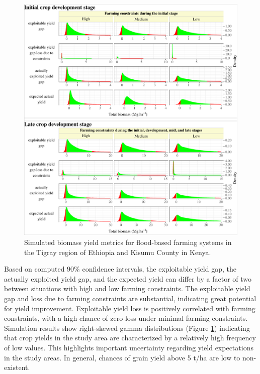 \documentclass[]{elsarticle} %
\begin{document}
\begin{figure}[!h]

{\centering \includegraphics[width=1\linewidth,]{figures/Modelling_FBFS_biomass_yield_Initial_and_late_stage} 

}

\caption{Simulated biomass yield metrics for flood-based farming systems in the Tigray region of Ethiopia and Kisumu County in Kenya.}\label{fig:fig8}
\end{figure}

Based on computed 90\% confidence intervals, the exploitable yield gap, the actually exploited yield gap, and the expected yield can differ by a factor of two between situations with high and low farming constraints. The exploitable yield gap and loss due to farming constraints are substantial, indicating great potential for yield improvement. Exploitable yield loss is positively correlated with farming constraints, with a high chance of zero loss under minimal farming constraints. Simulation results show right-skewed gamma distributions (Figure \ref{fig:fig8}) indicating that crop yields in the study area are characterized by a relatively high frequency of low values. This highlights important uncertainty regarding yield expectations in the study areas. In general, chances of grain yield above 5 t/ha are low to non-existent.
\end{document}
